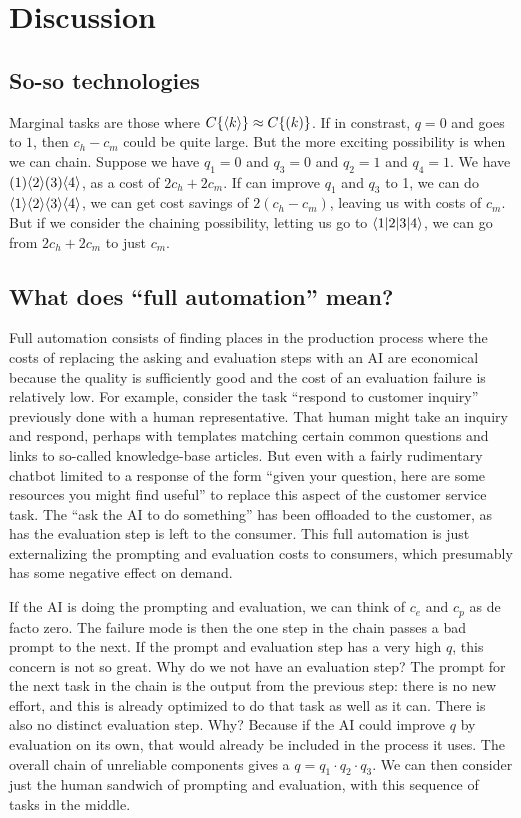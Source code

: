 \documentclass{article}
\begin{document}
\section{Discussion}

\subsection{So-so technologies}
Marginal tasks are those where $C\{ \langle k \rangle \} \approx C\{ ( k ) \}$.
If in constrast, $q = 0$ and goes to $1$, then $c_h - c_m$ could be quite large.
But the more exciting possibility is when we can chain.
Suppose we have $q_1 = 0$ and $q_3 = 0$ and $q_2 = 1$ and $q_4 = 1$.
We have $( 1 )\langle 2 \rangle( 3 )\langle 4 \rangle$, as a cost of $2c_h + 2c_m$.
If can improve $q_1$ and $q_3$ to 1, we can do $\langle 1 \rangle\langle 2 \rangle\langle 3 \rangle\langle 4 \rangle$,  we can get cost savings of $2 (c_h - c_m)$, leaving us with costs of $c_m$.
But if we consider the chaining possibility, letting us go to $\langle 1|2|3|4 \rangle $, we can go from $2c_h + 2c_m$ to just $c_m$. 

\subsection{What does ``full automation'' mean?}
Full automation consists of finding places in the production process where the costs of replacing the asking and evaluation steps with an AI are economical because the quality is sufficiently good and the cost of an evaluation failure is relatively low. 
For example, consider the task ``respond to customer inquiry'' previously done with a human representative. 
That human might take an inquiry and respond, perhaps with templates matching certain common questions and links to so-called knowledge-base articles. 
But even with a fairly rudimentary chatbot limited to a response of the form ``given your question, here are some resources you might find useful'' to replace this aspect of the customer service task.
The ``ask the AI to do something'' has been offloaded to the customer, as has the evaluation step is left to the consumer.
This full automation is just externalizing the prompting and evaluation costs to consumers, which presumably has some negative effect on demand.  

If the AI is doing the prompting and evaluation, we can think of $c_e$ and $c_p$ as de facto zero.
The failure mode is then the one step in the chain passes a bad prompt to the next. 
If the prompt and evaluation step has a very high $q$, this concern is not so great. 
Why do we not have an evaluation step? 
The prompt for the next task in the chain is the output from the previous step: there is no new effort, and this is already optimized to do that task as well as it can. 
There is also no distinct evaluation step. Why? 
Because if the AI could improve $q$ by evaluation on its own, that would already be included in the process it uses. 
The overall chain of unreliable components gives a $q = q_1 \cdot q_2 \cdot q_3$.
We can then consider just the human sandwich of prompting and evaluation, with this sequence of tasks in the middle.  
\end{document}
